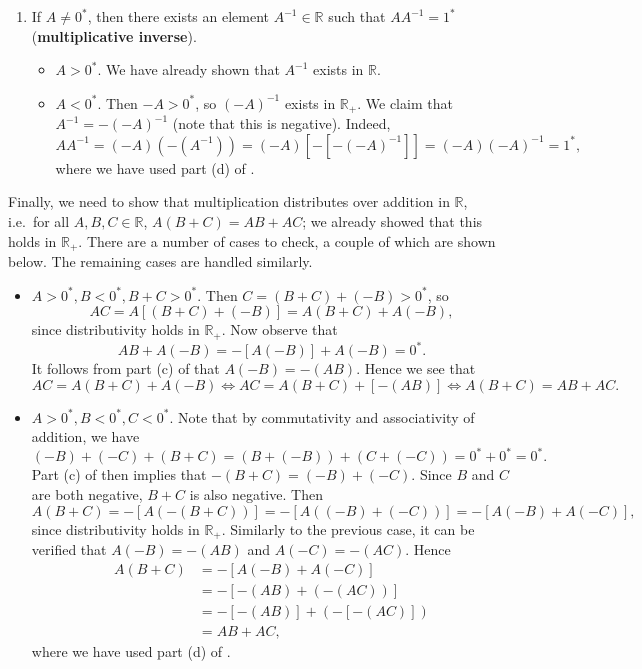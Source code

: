 \documentclass[12pt]{article}
\theoremstyle{definition}
\begin{document}
\begin{enumerate}[label = (M\arabic*)]
    \item If \( A \neq 0^* \), then there exists an element \( A^{-1} \in \mathbb{R} \) such that \( A A^{-1} = 1^* \) (\textbf{multiplicative inverse}).

    \begin{itemize}
        \item \( A > 0^* \). We have already shown that \( A^{-1} \) exists in \( \mathbb{R} \).

        \item \( A < 0^* \). Then \( -A > 0^* \), so \( (-A)^{-1} \) exists in \( \mathbb{R}_+ \). We claim that \( A^{-1} = -(-A)^{-1} \) (note that this is negative). Indeed,
        \[
            A A^{-1} = (-A)(-\left(A^{-1}\right)) = (-A)[-[-(-A)^{-1}]] = (-A)(-A)^{-1} = 1^*,
        \]
        where we have used part (d) of .
    \end{itemize}
\end{enumerate}

Finally, we need to show that multiplication distributes over addition in \( \mathbb{R} \), i.e.\ for all \( A, B, C \in \mathbb{R} \), \( A(B + C) = AB + AC \); we already showed that this holds in \( \mathbb{R}_+ \). There are a number of cases to check, a couple of which are shown below. The remaining cases are handled similarly.

\begin{itemize}
    \item \( A > 0^*, B < 0^*, B + C > 0^* \). Then \( C = (B + C) + (-B) > 0^* \), so
    \[
        AC = A[(B + C) + (-B)] = A(B + C) + A(-B),
    \]
    since distributivity holds in \( \mathbb{R}_+ \). Now observe that
    \[
        AB + A(-B) = -[A(-B)] + A(-B) = 0^*.
    \]
    It follows from part (c) of  that \( A(-B) = -(AB) \). Hence we see that
    \[
        AC = A(B + C) + A(-B) \iff AC = A(B + C) + [-(AB)] \iff A(B + C) = AB + AC.
    \]

    \item \( A > 0^*, B < 0^*, C < 0^* \). Note that by commutativity and associativity of addition, we have
    \[
        (-B) + (-C) + (B + C) = (B + (-B)) + (C + (-C)) = 0^* + 0^* = 0^*.
    \]
    Part (c) of  then implies that \( -(B + C) = (-B) + (-C) \). Since \( B \) and \( C \) are both negative, \( B + C \) is also negative. Then
    \[
        A(B + C) = -[A(-(B + C))] = -[A((-B) + (-C))] = -[A(-B) + A(-C)],
    \]
    since distributivity holds in \( \mathbb{R}_+ \). Similarly to the previous case, it can be verified that \( A(-B) = -(AB) \) and \( A(-C) = -(AC) \). Hence
    \begin{align*}
        A(B + C) &= -[A(-B) + A(-C)] \\
        &= -[-(AB) + (-(AC))] \\
        &= -[-(AB)] + (-[-(AC)]) \\
        &= AB + AC,
    \end{align*}
    where we have used part (d) of .
\end{itemize}
\end{document}
